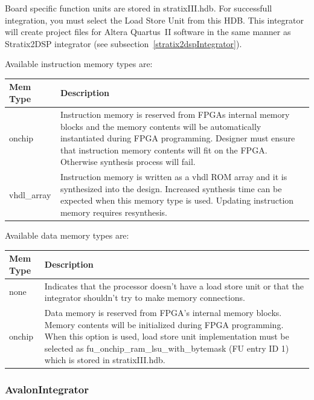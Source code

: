 \documentclass[a4paper,twoside]{tceusermanual}
\begin{document}
Board specific function units are stored in stratixIII.hdb. For
successfull integration, you must select the Load Store Unit from this
HDB. This integrator will create project files for Altera Quartus~II
software in the same manner as Stratix2DSP integrator (see
subsection~\ref{stratix2dspIntegrator}).

Available instruction memory types are:
\begin{center}
\begin{longtable}[htb]{@{}p{}%
                     @{}p{}}

\textbf{Mem Type} &\textbf{Description} \\
\hline
onchip & Instruction memory is reserved from FPGAs internal memory blocks and
the memory contents will be automatically instantiated during FPGA programming.
Designer must ensure that instruction memory contents will fit on the FPGA.
Otherwise synthesis process will fail. \\
vhdl\_array & Instruction memory is written as a vhdl ROM array and it is
synthesized into the design. Increased synthesis time can be expected when this
memory type is used. Updating instruction memory requires resynthesis.
\end{longtable}
\end{center}

Available data memory types are:
\begin{center}
\begin{longtable}[htb]{@{}p{}%
                     @{}p{}}

\textbf{Mem Type} &\textbf{Description} \\
\hline
none & Indicates that the processor doesn't have a load store unit or that the
integrator shouldn't try to make memory connections. \\

onchip & Data memory is reserved from FPGA's internal memory
blocks. Memory contents will be initialized during FPGA
programming. When this option is used, load store unit implementation
must be selected as fu\_onchip\_ram\_lsu\_with\_bytemask (FU entry ID
1) which is stored in stratixIII.hdb.
\end{longtable}
\end{center}


\subsubsection{AvalonIntegrator}
\end{document}
